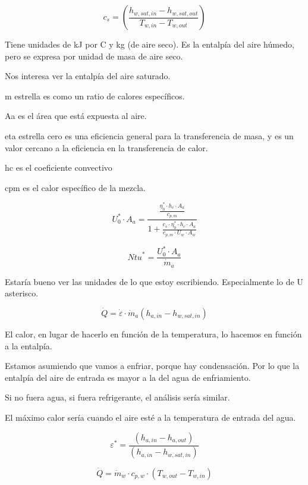 \begin{equation}
     c_s = \left(\frac{h_{w,sat,in}-h_{w,sat,out}}{T_{w,in}-T_{w,out}}\right)
\end{equation}

Tiene unidades de kJ por C y kg (de aire seco). Es la entalpía del aire húmedo, pero se expresa por unidad de masa de aire seco.

Nos interesa ver la entalpía del aire saturado.

m estrella es como un ratio de calores específicos.

Aa es el área que está expuesta al aire.

eta estrella cero es una eficiencia general para la transferencia de masa, y es un valor cercano a la eficiencia en la transferencia de calor.

hc es el coeficiente convectivo

cpm es el calor específico de la mezcla.

\begin{equation}
     U_0^{\ast}\cdot A_a = \frac{\frac{\eta_0^{\ast}\cdot h_c \cdot A_a}{c_{p,m}}}{1+\frac{c_s\cdot \eta^{\ast}_0 \cdot h_c \cdot A_a}{c_{p,m}\cdot U_w \cdot A_w}}
\end{equation}


\begin{equation}
     {Ntu}^{\ast}=\frac{U_0^{\ast}\cdot A_a}{\dot{m}_a}
\end{equation}

Estaría bueno ver las unidades de lo que estoy escribiendo. Especialmente lo de U asterisco.

\begin{equation}
     \dot{Q}=\dot{\varepsilon}\cdot\dot{m}_a\left(h_{a,in}-h_{w,sat,in}\right)
\end{equation}

El calor, en lugar de hacerlo en función de la temperatura, lo hacemos en función a la entalpía.

Estamos asumiendo que vamos a enfriar, porque hay condensación. Por lo que la entalpía del aire de entrada es mayor a la del agua de enfriamiento.

Si no fuera agua, si fuera refrigerante, el análisis sería similar.

El máximo calor sería cuando el aire esté a la temperatura de entrada del agua.

\begin{equation}
     \varepsilon^{\ast}=\frac{\left(h_{a,in}-h_{a,out}\right)}{\left( h_{a,in}-h_{w,sat,in}\right)}
\end{equation}

\begin{equation}
     \dot{Q}=\dot{m}_w \cdot c_{p,w} \cdot \left(T_{w,out}-T_{w,in}\right)
\end{equation}

